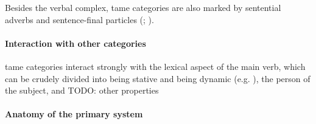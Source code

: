 \documentclass[a4paper, oneside, 12pt]{report}
\newcommand*{\citesec}[1]{\S~{#1}}
\newcommand*{\citepage}[1]{p.~{#1}}
\begin{document}
Besides the verbal complex, \acs{tame} categories are also marked by 
sentential adverbs and sentence-final particles 
(\citealt[\citepage{518}]{jacques2019egophoric}; \citealt[\citesec{21.8}]{jacques2021grammar}).

\paragraph*{Interaction with other categories}

\acs{tame} categories interact strongly with 
the lexical aspect of the main verb,
which can be crudely divided into being stative 
and being dynamic (e.g. \citealt[\citesec{21.3.1.2}]{jacques2021grammar}),
the person of the subject, and  TODO: other properties

\paragraph*{Anatomy of the primary system}
\end{document}
